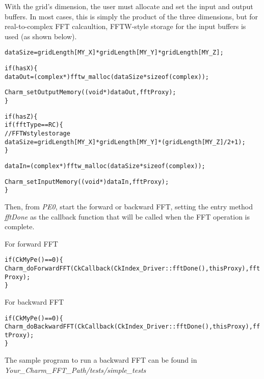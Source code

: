 \noindent With the grid's dimension, the user must allocate and set the input and
output buffers. In most cases, this is simply the product of the three
dimensions, but for real-to-complex FFT calcaultion, FFTW-style storage for
the input buffers is used (as shown below).

\begin{alltt}
    dataSize = gridLength[MY\_X] * gridLength[MY\_Y] * gridLength[MY\_Z];

    if (hasX) \{
      dataOut = (complex*) fftw\_malloc(dataSize * sizeof(complex));

      Charm\_setOutputMemory((void*) dataOut, fftProxy);
    \}

    if (hasZ) \{
      if (fftType == RC) \{
        // FFTW style storage
        dataSize = gridLength[MY\_X] * gridLength[MY\_Y] * (gridLength[MY\_Z]/2 + 1);
      \}

      dataIn = (complex*) fftw\_malloc(dataSize * sizeof(complex));

      Charm\_setInputMemory((void*) dataIn, fftProxy);
    \}
\end{alltt}

\noindent Then, from \textit{PE0}, start the forward or backward FFT, setting
the entry method \textit{fftDone} as the callback function that will be called
when the FFT operation is complete.

\noindent For forward FFT
\begin{alltt}
    if (CkMyPe() == 0) \{
        Charm\_doForwardFFT(CkCallback(CkIndex\_Driver::fftDone(), thisProxy), fftProxy);
    \}
\end{alltt}

\noindent For backward FFT
\begin{alltt}
    if (CkMyPe() == 0) \{
        Charm\_doBackwardFFT(CkCallback(CkIndex\_Driver::fftDone(), thisProxy), fftProxy);
    \}
\end{alltt}

\noindent The sample program to run a backward FFT can be found in
\textit{Your\_Charm\_FFT\_Path/tests/simple\_tests}

\begin{alltt}
\end{alltt}

